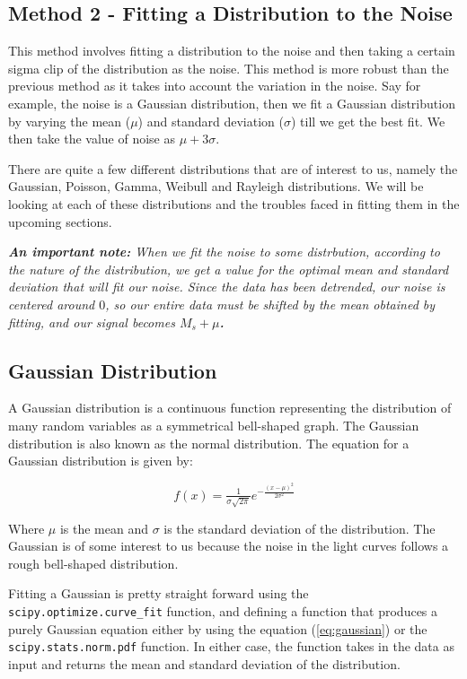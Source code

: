 \documentclass[11pt]{book} %
\begin{document}
\subsection{Method 2 - Fitting a Distribution to the Noise} \label{sec:method2}

This method involves fitting a distribution to the noise and then taking a certain sigma clip of the distribution as the noise. This method is more robust than the previous method as it takes into account the variation in the noise. Say for example, the noise is a Gaussian distribution, then we fit a Gaussian distribution by varying the mean ($\mu$) and standard deviation ($\sigma$) till we get the best fit. We then take the value of noise as $\mu+3\sigma$. 

There are quite a few different distributions that are of interest to us, namely the Gaussian, Poisson, Gamma, Weibull and Rayleigh distributions. We will be looking at each of these distributions and the troubles faced in fitting them in the upcoming sections.

\textit{\textbf{An important note:} When we fit the noise to some distrbution, according to the nature of the distribution, we get a value for the optimal mean and standard deviation that will fit our noise. Since the data has been detrended, our noise is centered around $0$, so our entire data must be shifted by the mean obtained by fitting, and our signal becomes \textbf{$M_s+\mu$.}}


\newpage

\subsection{Gaussian Distribution}

A Gaussian distribution is a continuous function representing the distribution of many random variables as a symmetrical bell-shaped graph. The Gaussian distribution is also known as the normal distribution. The equation for a Gaussian distribution is given by:

\begin{equation} \label{eq:gaussian}
    f(x) = \tfrac{1}{\sigma\sqrt{2\pi}}e^{-\tfrac{(x-\mu)^2}{2\sigma^2}}
\end{equation}

Where $\mu$ is the mean and $\sigma$ is the standard deviation of the distribution. The Gaussian is of some interest to us because the noise in the light curves follows a rough bell-shaped distribution. 

Fitting a Gaussian is pretty straight forward using the \lstinline[language=Python]{scipy.optimize.curve_fit} function, and defining a function that produces a purely Gaussian equation either by using the equation (\ref{eq:gaussian}) or the \lstinline[language=Python]{scipy.stats.norm.pdf} function. In either case, the function takes in the data as input and returns the mean and standard deviation of the distribution. 
\end{document}
